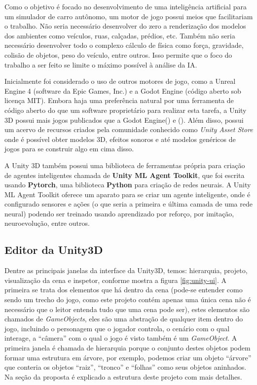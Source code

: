 Como o objetivo é focado no desenvolvimento de uma inteligência artificial para um simulador de carro autônomo, um motor de jogo possui meios que facilitariam o trabalho. Não seria necessário desenvolver do zero a renderização dos modelos dos ambientes como veículos, ruas, calçadas, prédios, etc. Também não seria necessário desenvolver todo o complexo cálculo de física como força, gravidade, colisão de objetos, peso do veículo, entre outros. Isso permite que o foco do trabalho a ser feito se limite o máximo possível à análise da IA.

Inicialmente foi considerado o uso de outros motores de jogo, como a Unreal Engine 4 (software da Epic Games, Inc.) e a Godot Engine (código aberto sob licença MIT). Embora haja uma preferência natural por uma ferramenta de código aberto do que um software proprietário para realizar esta tarefa, a Unity 3D possui mais jogos publicados que a Godot Engine() e (). Além disso, possui um acervo de recursos criados pela comunidade conhecido como \textit{Unity Asset Store} onde é possível obter modelos 3D, efeitos sonoros e até modelos genéricos de jogos para se construir algo em cima disso. 

A Unity 3D também possui uma biblioteca de ferramentas própria para criação de agentes inteligentes chamada de \textbf{Unity ML Agent Toolkit}, que foi escrita usando \textbf{Pytorch}, uma biblioteca \textbf{Python} para criação de redes neurais. A Unity ML Agent Toolkit oferece um aparato para se criar um agente inteligente, onde é configurado sensores e ações (o que seria a primeira e última camada de uma rede neural) podendo ser treinado usando aprendizado por reforço, por imitação, neuroevolução, entre outros.

\subsection{Editor da Unity3D}
Dentre as principais janelas da interface da Unity3D, temos: hierarquia, projeto, visualização da cena e inspetor, conforme mostra a figura \ref*{fig:unity-ui}. A primeira se trata dos elementos que há dentro da cena (pode-se entender como sendo um trecho do jogo, como este projeto contém apenas uma única cena não é necessário que o leitor entenda tudo que uma cena pode ser), estes elementos são chamados de \textit{GameObjects}, eles são uma abstração de qualquer item dentro do jogo, incluindo o personagem que o jogador controla, o cenário com o qual interage, a ``câmera'' com o qual o jogo é visto também é um \textit{GameObject}. A primeira janela é chamada de hierarquia porque o conjunto destes objetos podem formar uma estrutura em árvore, por exemplo, podemos criar um objeto ``árvore'' que conteria os objetos ``raiz'', ``tronco'' e ``folhas'' como seus objetos aninhados. Na seção da proposta é explicado a estrutura deste projeto com mais detalhes.

